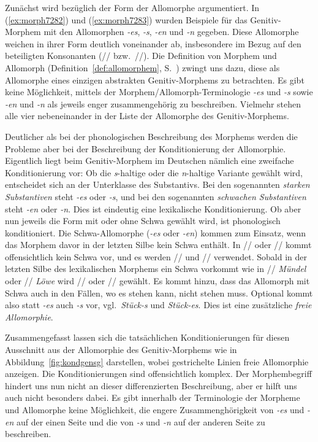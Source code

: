 Zunächst wird bezüglich der Form der Allomorphe argumentiert. 
In (\ref{ex:morph7282}) und (\ref{ex:morph7283}) wurden Beispiele für das Genitiv-Morphem mit den Allomorphen \textit{-es}, \textit{-s}, \textit{-en} und \textit{-n} gegeben.
Diese Allomorphe weichen in ihrer Form deutlich voneinander ab, insbesondere im Bezug auf den beteiligten Konsonanten (// bzw.\ //).
Die Definition von Morphem und Allomorph (Definition~\ref{def:allomorphem}, S.~\pageref{def:allomorphem}) zwingt uns dazu, diese als Allomorphe eines einzigen abstrakten Genitiv-Morphems zu betrachten.
Es gibt keine Möglichkeit, mittels der Morphem\slash Allomorph-Terminologie \textit{-es} und \textit{-s} sowie \textit{-en} und \textit{-n} als jeweils enger zusammengehörig zu beschreiben.
Vielmehr stehen alle vier nebeneinander in der Liste der Allomorphe des Genitiv-Morphems.

Deutlicher als bei der phonologischen Beschreibung des Morphems werden die Probleme aber bei der Beschreibung der Konditionierung der Allomorphie.
Eigentlich liegt beim Genitiv-Morphem im Deutschen nämlich eine zweifache Konditionierung vor:
Ob die \textit{s}-haltige oder die \textit{n}-haltige Variante gewählt wird, entscheidet sich an der Unterklasse des Substantivs.
Bei den sogenannten \textit{starken Substantiven} steht \textit{-es} oder \textit{-s}, und bei den sogenannten \textit{schwachen Substantiven} steht \textit{-en} oder \textit{-n}.
Dies ist eindeutig eine lexikalische Konditionierung.
Ob aber nun jeweils die Form mit oder ohne Schwa gewählt wird, ist phonologisch konditioniert.
Die Schwa-Allomorphe (\textit{-es} oder \textit{-en}) kommen zum Einsatz, wenn das Morphem davor in der letzten Silbe kein Schwa enthält.
In // oder // kommt offensichtlich kein Schwa vor, und es werden // und // verwendet.
Sobald in der letzten Silbe des lexikalischen Morphems ein Schwa vorkommt wie in // \textit{Mündel} oder // \textit{Löwe} wird // oder // gewählt.
Es kommt hinzu, dass das Allomorph mit Schwa auch in den Fällen, wo es stehen kann, nicht stehen muss.
Optional kommt also statt \textit{-es} auch \textit{-s} vor, vgl.\ \textit{Stück-s} und \textit{Stück-es}.
Dies ist eine zusätzliche \textit{freie Allomorphie}.

Zusammengefasst lassen sich die tatsächlichen Konditionierungen für diesen Ausschnitt aus der Allomorphie des Genitiv-Morphems wie in Abbildung~\ref{fig:kondgensg} darstellen, wobei gestrichelte Linien freie Allomorphie anzeigen.
Die Konditionierungen sind offensichtlich komplex.
Der Morphembegriff hindert uns nun nicht an dieser differenzierten Beschreibung, aber er hilft uns auch nicht besonders dabei.
Es gibt innerhalb der Terminologie der Morpheme und Allomorphe keine Möglichkeit, die engere Zusammenghörigkeit von \textit{-es} und \textit{-en} auf der einen Seite und die von \textit{-s} und \textit{-n} auf der anderen Seite zu beschreiben.


